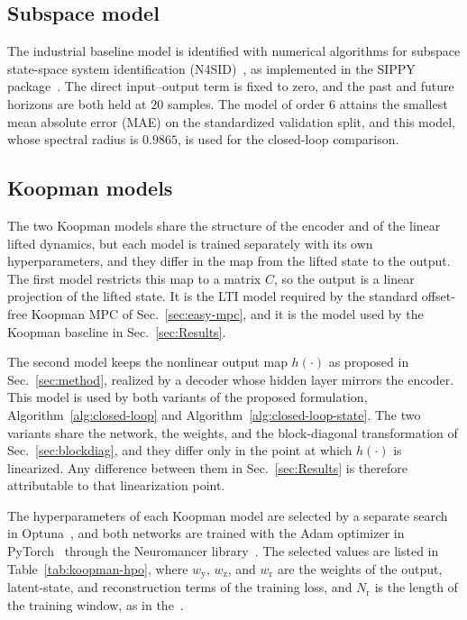 \documentclass[preprint,12pt,authoryear]{elsarticle}
\theoremstyle{remark}
\begin{document}
\subsection{Subspace model}


The industrial baseline model is identified with numerical algorithms for subspace state-space system identification (N4SID)~\cite{van2012subspace}, as implemented in the SIPPY package~\cite{armenise2018sippy}. The direct input--output term is fixed to zero, and the past and future horizons are both held at $20$ samples. The model of order $6$ attains the smallest mean absolute error (MAE) on the standardized validation split, and this model, whose spectral radius is $0.9865$, is used for the closed-loop comparison.

\subsection{Koopman models}

The two Koopman models share the structure of the encoder and of the linear lifted dynamics, but each model is trained separately with its own hyperparameters, and they differ in the map from the lifted state to the output. The first model restricts this map to a matrix $C$, so the output is a linear projection of the lifted state. It is the LTI model required by the standard offset-free Koopman MPC of Sec.~\ref{sec:easy-mpc}, and it is the model used by the Koopman baseline in Sec.~\ref{sec:Results}. 

The second model keeps the nonlinear output map $h(\cdot)$ as proposed in Sec.~\ref{sec:method}, realized by a decoder whose hidden layer mirrors the encoder. This model is used by both variants of the proposed formulation, Algorithm~\ref{alg:closed-loop} and Algorithm~\ref{alg:closed-loop-state}. The two variants share the network, the weights, and the block-diagonal transformation of Sec.~\ref{sec:blockdiag}, and they differ only in the point at which $h(\cdot)$ is linearized. Any difference between them in Sec.~\ref{sec:Results} is therefore attributable to that linearization point.

The hyperparameters of each Koopman model are selected by a separate search in Optuna~\cite{akiba2019optuna}, and both networks are trained with the Adam optimizer in PyTorch~\cite{paszke2019pytorch} through the Neuromancer library~\cite{Neuromancer2023}. The selected values are listed in Table~\ref{tab:koopman-hpo}, where $w_\text{y}$, $w_\text{z}$, and $w_\text{r}$ are the weights of the output, latent-state, and reconstruction terms of the training loss, and $N_\text{r}$ is the length of the training window, as in the~\cite{lusch2018deep}.
\end{document}
